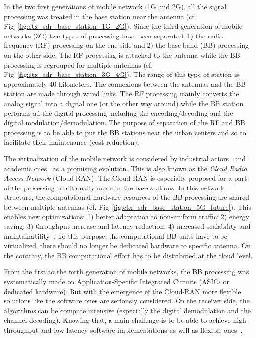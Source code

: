 In the two first generations of mobile network (1G and 2G), all the signal
processing was treated in the base station near the antenna (cf.
Fig~\ref{fig:ctx_sdr_base_station_1G_2G}). Since the third generation of mobile
networks (3G) two types of processing have been separated: 1) the radio
frequency (RF) processing on the one side and 2) the base band (BB) processing
on the other side. The RF processing is attached to the antenna while the BB
processing is regrouped for multiple antennas (cf.
Fig~\ref{fig:ctx_sdr_base_station_3G_4G}). The range of this type of station is
approximately 40 kilometers. The connexions between the antennas and the BB
station are made through wired links. The RF processing mainly converts the
analog signal into a digital one (or the other way around) while the BB station
performs all the digital processing including the encoding/decoding and the
digital modulation/demodulation. The purpose of separation of the RF and BB
processing is to be able to put the BB stations near the urban centers and so to
facilitate their maintenance (cost reduction).

The virtualization of the mobile network is considered by industrial
actors~\cite{Huawei2013,Ericsson2015} and academic ones~\cite{Wubben2014,
Rost2014,Checko2015a} as a promising evolution. This is also known as the
\emph{Cloud Radio Access Network} (Cloud-RAN). The Cloud-RAN is especially
proposed for a part of the processing traditionally made in the base stations.
In this network structure, the computational hardware resources of the BB
processing are shared between multiple antennas (cf.
Fig~\ref{fig:ctx_sdr_base_station_5G_future}). This enables new optimizations:
1) better adaptation to non-uniform traffic; 2) energy saving; 3) throughput
increase and latency reduction; 4) increased scalability and
maintainability~\cite{Checko2015a}. To this purpose, the computational BB units
have to be virtualized: there should no longer be dedicated hardware to specific
antenna. On the contrary, the BB computational effort has to be distributed at
the cloud level.

From the first to the forth generation of mobile networks, the BB processing was
systematically made on Application-Specific Integrated Circuits (ASICs or
dedicated hardware). But with the emergence of the Cloud-RAN more flexible
solutions like the software ones are seriously considered. On the receiver side,
the algorithms can be compute intensive (especially the digital demodulation and
the channel decoding). Knowing that, a main challenge is to be able to achieve
high throughput and low latency software implementations as well as flexible
ones~\cite{Nikaein2015,Rodriguez2017}.

